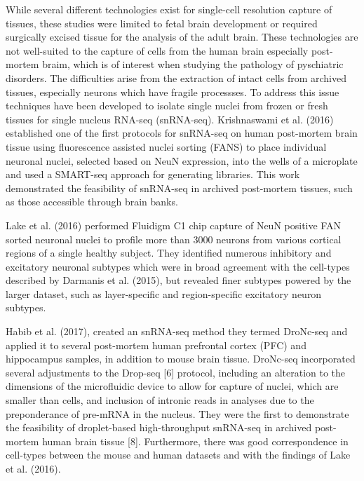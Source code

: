 \documentclass[12pt]{article}
\begin{document}
While several different technologies exist for single-cell resolution capture of tissues, these studies were limited to fetal brain development or required surgically excised tissue for the analysis of the adult brain. These technologies are not well-suited to the capture of cells from the human brain especially post-mortem braim, which is of interest when studying the pathology of pyschiatric disorders. The difficulties arise from the extraction of intact cells from archived tissues, especially neurons which have fragile processses. To address this issue techniques have been developed to isolate single nuclei from frozen or fresh tissues for single nucleus RNA-seq (snRNA-seq). Krishnaswami et al. (2016) established one of the first protocols for snRNA-seq on human post-mortem brain tissue using fluorescence assisted nuclei sorting (FANS) to place individual neuronal nuclei, selected based on NeuN expression, into the wells of a microplate and used a SMART-seq approach for generating libraries. This work demonstrated  the feasibility of snRNA-seq in archived post-mortem tissues, such as those accessible through brain banks.





Lake et al. (2016) performed Fluidigm C1 chip capture of NeuN positive FAN sorted neuronal nuclei to profile more than 3000 neurons from various cortical regions of a single healthy subject.
They identified numerous inhibitory and excitatory neuronal subtypes which were in broad agreement with the cell-types described by Darmanis et al. (2015), but revealed finer subtypes powered by the larger dataset, such as layer-specific and region-specific excitatory neuron subtypes.

Habib et al. (2017), created an snRNA-seq method they termed DroNc-seq and applied it to several post-mortem human prefrontal cortex (PFC) and hippocampus samples, in addition to mouse brain tissue. DroNc-seq incorporated several adjustments to the Drop-seq [6] protocol, including an alteration to the dimensions of the microfluidic device to allow for capture of nuclei, which are smaller than cells, and inclusion of intronic reads in analyses due to the preponderance of pre-mRNA in the nucleus. They were the first to demonstrate the feasibility of droplet-based high-throughput snRNA-seq in archived post-mortem human brain tissue [8]. Furthermore, there was good correspondence in cell-types between the mouse and human datasets and with the findings of Lake et al. (2016).
\end{document}
